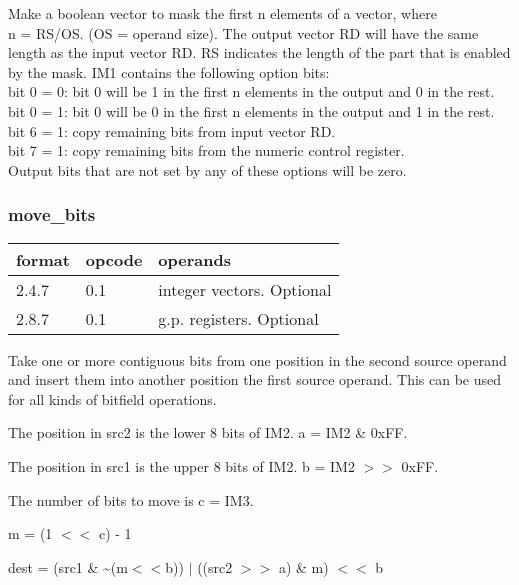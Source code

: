 \documentclass[forwardcom.tex]{subfiles}
\begin{document}
Make a boolean vector to mask the first n elements of a vector, where \\
n = RS/OS. (OS = operand size). 
The output vector RD will have the same length as the input vector RD. RS indicates the length of the part that is enabled by the mask. IM1 contains the following option bits: \\
bit 0 = 0: bit 0 will be 1 in the first n elements in the output and 0 in the rest. \\
bit 0 = 1: bit 0 will be 0 in the first n elements in the output and 1 in the rest. \\
bit 6 = 1: copy remaining bits from input vector RD. \\
bit 7 = 1: copy remaining bits from the numeric control register. \\
Output bits that are not set by any of these options will be zero.

\subsubsection{move\_bits}
\label{table:moveBitsInstruction}
\begin{tabular}{|p{12mm}|p{12mm}|p{110mm}|}
\hline
\bfseries format & \bfseries opcode & \bfseries operands \\ \hline
2.4.7 & 0.1 & integer vectors. Optional \\ \hline
2.8.7 & 0.1 & g.p. registers. Optional \\ \hline
\end{tabular}
\vspace{2mm}

Take one or more contiguous bits from one position in the second source operand and insert them into another position the first source operand. This can be used for all kinds of bitfield operations.
\vspace{2mm}

The position in src2 is the lower 8 bits of IM2. a = IM2 \& 0xFF.

The position in src1 is the upper 8 bits of IM2. b = IM2 $>>$ 0xFF.

The number of bits to move is c = IM3.
\vspace{2mm}

m = (1 $<<$ c) - 1

dest = (src1 \& \~{}(m$<<$b)) $|$ ((src2 $>>$ a) \& m) $<<$ b
\end{document}
